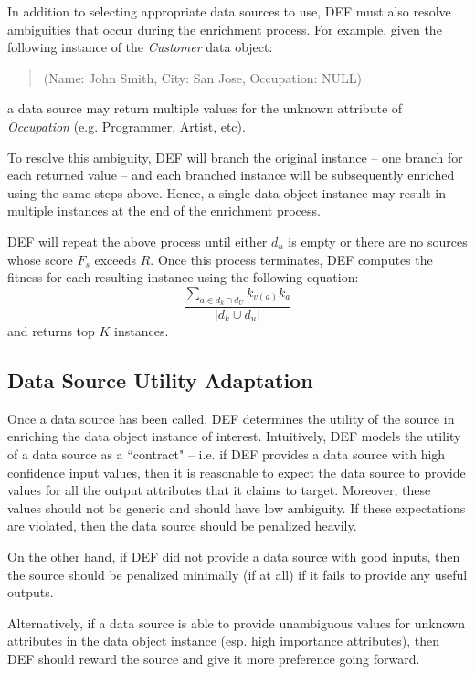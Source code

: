 In addition to selecting appropriate data sources to use, DEF must also resolve ambiguities that occur 
during the enrichment process. For example, given the following instance of the {\it Customer} data object:
\begin{quote}
	(Name: John Smith, City: San Jose, Occupation: NULL)
\end{quote}
a data source may return multiple values for the unknown attribute of {\it Occupation} (e.g. Programmer, 
Artist, etc).

To resolve this ambiguity, DEF will branch the original instance -- one branch for each returned value -- 
and each branched instance will be subsequently enriched using the same steps above. Hence, a single data 
object instance may result in multiple instances at the end of the enrichment process. 

DEF will repeat the above process until either $d_u$ is empty or there are no sources whose score 
$F_s$ exceeds $R$. Once this process terminates, DEF computes the fitness for each resulting instance 
using the following equation:
\begin{equation}
	\frac{\displaystyle\sum\limits_{a \in d_k \cap d_U} k_{v(a)} k_a }{|d_k \cup d_u|}
\end{equation}
and returns top $K$ instances.


\subsection{Data Source Utility Adaptation}

Once a data source has been called, DEF determines the utility of the source in enriching the data
object instance of interest. Intuitively, DEF models the utility of a data source as a ``contract" 
-- i.e. if DEF provides a data source with high confidence input values, then it is reasonable to 
expect the data source to provide values for all the output attributes that it claims to target. 
Moreover, these values should not be generic and should have low ambiguity. If these expectations 
are violated, then the data source should be penalized heavily. 

On the other hand, if DEF did not provide a data source with good inputs, then the source should
be penalized minimally (if at all) if it fails to provide any useful outputs.

Alternatively, if a data source is able to provide unambiguous values for unknown attributes in 
the data object instance (esp. high importance attributes), then DEF should reward the source
and give it more preference going forward.

